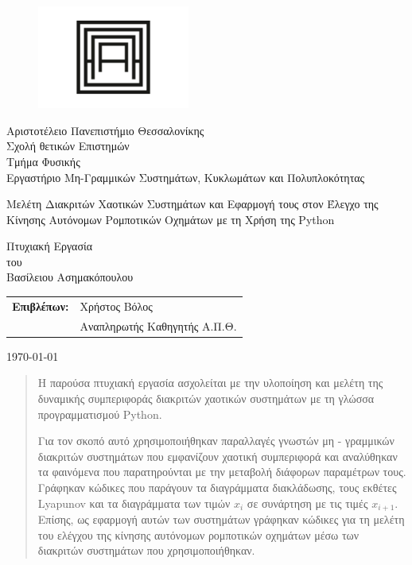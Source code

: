 \begin{titlepage}
	\afterpage{\blankpage}	
	\begin{figure}[H]
		\begin{center}
			\includegraphics[width=5cm]{LateX images/auth}
			\label{fig:cover_auth_logo}
		\end{center}
	\end{figure}
	
	\centering
	\Large Αριστοτέλειο Πανεπιστήμιο Θεσσαλονίκης\\
	\Large Σχολή θετικών Επιστημών\\
	\large Τμήμα Φυσικής\\
	\large Εργαστήριο Μη-Γραμμικών Συστημάτων, Κυκλωμάτων και Πολυπλοκότητας
	
	\vspace{\fill}
	
	\LARGE Μελέτη Διακριτών Χαοτικών Συστημάτων και Εφαρμογή τους στον Έλεγχο της Κίνησης Αυτόνομων  Ρομποτικών Οχημάτων με τη Χρήση της Python
	
	\vspace{\fill}
	
	\Large Πτυχιακή Εργασία\\
	\Large του\\
	\Large Βασίλειου Ασημακόπουλου
	
	\vspace{\fill}
	\raggedright
	
	\begin{tabular}{ll}
		\textbf{Επιβλέπων:} & Χρήστος Βόλος\\
		& Αναπληρωτής Καθηγητής Α.Π.Θ.\\
	\end{tabular}
	
	\centering
	\vspace{\fill}
	\today
	
\end{titlepage}
\afterpage{\blankpage}
\begin{abstract}
	H παρούσα πτυχιακή εργασία ασχολείται με την υλοποίηση και μελέτη της δυναμικής συμπεριφοράς διακριτών χαοτικών συστημάτων με τη γλώσσα προγραμματισμού Python.   
	
	Για τον σκοπό αυτό χρησιμοποιήθηκαν παραλλαγές γνωστών μη - γραμμικών διακριτών συστημάτων που εμφανίζουν χαοτική συμπεριφορά και αναλύθηκαν τα φαινόμενα που παρατηρούνται με την μεταβολή διάφορων παραμέτρων τους. Γράφηκαν κώδικες που παράγουν τα διαγράμματα διακλάδωσης, τους εκθέτες Lyapunov και τα διαγράμματα των τιμών $x_i$ σε συνάρτηση με τις τιμές $x_{i+1}$. Επίσης, ως εφαρμογή αυτών των συστημάτων γράφηκαν κώδικες για τη μελέτη του ελέγχου της κίνησης αυτόνομων ρομποτικών οχημάτων μέσω των διακριτών συστημάτων που χρησιμοποιήθηκαν. 
	
\end{abstract}
